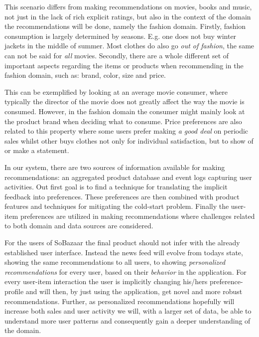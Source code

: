 This scenario differs from making recommendations on movies, books and music,
not just in the lack of rich explicit ratings, but also in the context of the
domain the recommendations will be done, namely the fashion domain. Firstly,
fashion consumption is largely determined by seasons. E.g. one does not buy
winter jackets in the middle of summer. Most clothes do also go \textit{out of
fashion}, the same can not be said for \emph{all} movies. Secondly, there are a
whole different set of important aspects regarding the items or products when
recommending in the fashion domain, such as: brand, color, size and price.

This can be exemplified by looking at an average movie consumer, where
typically the director of the movie does not greatly affect the way the movie
is consumed. However, in the fashion domain the consumer might mainly look at
the product brand when deciding what to consume. Price preferences are also
related to this property where some users prefer making \textit{a good deal} on
periodic sales whilst other buys clothes not only for individual satisfaction,
but to show of or make a statement.

In our system, there are two sources of information available for making
recommendations: an aggregated product database and event logs capturing user
activities. Out first goal is to find a technique for translating the implicit
feedback into preferences. These preferences are then combined with product
features and techniques for mitigating the cold-start problem. Finally the
user-item preferences are utilized in making recommendations where challenges
related to both domain and data sources are considered.

For the users of SoBazaar the final product should not infer with the already
established user interface. Instead the news feed will evolve from todays
state, showing the same recommendations to all users, to showing
\textit{personalized recommendations} for every user, based on their
\textit{behavior} in the application. For every user-item interaction the user
is implicitly changing his/hers preference-profile and will then, by just using
the application, get novel and more robust recommendations. Further, as
personalized recommendations hopefully will increase both sales and user
activity we will, with a larger set of data, be able to understand more user
patterns and consequently gain a deeper understanding of the domain.

